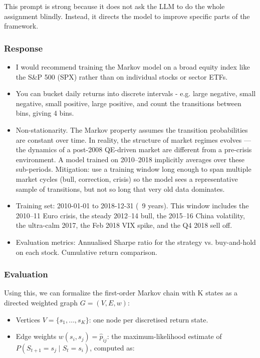 \documentclass{article}
\begin{document}
This prompt is strong because it does not ask the LLM to do the whole assignment blindly. Instead, it directs the model to improve specific parts of the framework. \\

\subsubsection{Response}

\begin{itemize}
    \item I would recommend training the Markov model on a broad equity index like the S\&P 500 (SPX) rather than on individual stocks or sector ETFs. 
    \item You can bucket daily returns into discrete intervals - e.g. large negative, small negative, small positive, large positive, and count the transitions between bins, giving 4 bins.
    \item Non-stationarity. The Markov property assumes the transition probabilities are constant over time. In reality, the structure of market regimes evolves — the dynamics of a post-2008 QE-driven market are different from a pre-crisis environment. A model trained on 2010–2018 implicitly averages over these sub-periods. Mitigation: use a training window long enough to span multiple market cycles (bull, correction, crisis) so the model sees a representative sample of transitions, but not so long that very old data dominates.
    \item Training set: 2010-01-01 to 2018-12-31 (~9 years). This window includes the 2010–11 Euro crisis, the steady 2012–14 bull, the 2015–16 China volatility, the ultra-calm 2017, the Feb 2018 VIX spike, and the Q4 2018 sell off. 
    \item Evaluation metrics: Annualised Sharpe ratio for the strategy vs. buy-and-hold on each stock. Cumulative return comparison.
\end{itemize}

\subsubsection{Evaluation}
Using this, we can formalize the first-order Markov chain with K states as a directed weighted graph $G = (V, E, w)$:


\begin{itemize}
    \item Vertices $V = \{s_1, \dots, s_K\}$: one node per discretised return state.
    \item Edge weights $w(s_i, s_j) = \hat{p}_{ij}$: the maximum-likelihood estimate of $P(S_{t+1} = s_j \mid S_t = s_i)$, computed as:
\end{itemize}
\end{document}
